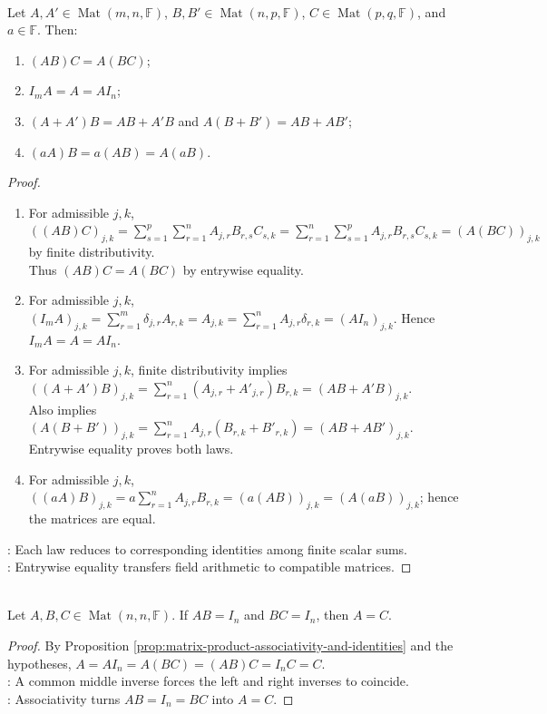 \begin{proposition} \label{prop:matrix-product-associativity-and-identities} \\
Let $A,A'\in\operatorname{Mat}(m,n,\mathbb{F})$, $B,B'\in\operatorname{Mat}(n,p,\mathbb{F})$, $C\in\operatorname{Mat}(p,q,\mathbb{F})$, and $a\in\mathbb{F}$. Then:
\begin{enumerate}[label=(\roman*)]
\setlength{\itemsep}{0pt}
\item $(AB)C=A(BC)$;
\item $I_mA=A=AI_n$;
\item $(A+A')B=AB+A'B$ and $A(B+B')=AB+AB'$;
\item $(aA)B=a(AB)=A(aB)$.
\end{enumerate}
\begin{proof}
\begin{enumerate}[label=(\roman*)]
\setlength{\itemsep}{0pt}
\item For admissible $j,k$, $((AB)C)_{j,k}=\sum\limits_{s=1}^{p}\sum\limits_{r=1}^{n}A_{j,r}B_{r,s}C_{s,k}=\sum\limits_{r=1}^{n}\sum\limits_{s=1}^{p}A_{j,r}B_{r,s}C_{s,k}=(A(BC))_{j,k}$ by finite distributivity.\\
Thus $(AB)C=A(BC)$ by entrywise equality.
\item For admissible $j,k$, $(I_mA)_{j,k}=\sum\limits_{r=1}^{m}\delta_{j,r}A_{r,k}=A_{j,k}=\sum\limits_{r=1}^{n}A_{j,r}\delta_{r,k}=(AI_n)_{j,k}$. Hence $I_mA=A=AI_n$.
\item For admissible $j,k$, finite distributivity implies $((A+A')B)_{j,k}=\sum\limits_{r=1}^{n}(A_{j,r}+A'_{j,r})B_{r,k}=(AB+A'B)_{j,k}$.\\
Also implies $(A(B+B'))_{j,k}=\sum\limits_{r=1}^{n}A_{j,r}(B_{r,k}+B'_{r,k})=(AB+AB')_{j,k}$. Entrywise equality proves both laws.
\item For admissible $j,k$, $((aA)B)_{j,k}=a\sum\limits_{r=1}^{n}A_{j,r}B_{r,k}=(a(AB))_{j,k}=(A(aB))_{j,k}$; hence the matrices are equal.
\end{enumerate}
: Each law reduces to corresponding identities among finite scalar sums.\\
: Entrywise equality transfers field arithmetic to compatible matrices.
\end{proof}
\end{proposition}

\begin{lemma} \label{lem:two-sided-inverse-uniqueness} \\
Let $A,B,C\in\operatorname{Mat}(n,n,\mathbb{F})$. If $AB=I_n$ and $BC=I_n$, then $A=C$.
\begin{proof}
By Proposition \ref{prop:matrix-product-associativity-and-identities} and the hypotheses, $A=AI_n=A(BC)=(AB)C=I_nC=C$.\\
: A common middle inverse forces the left and right inverses to coincide.\\
: Associativity turns $AB=I_n=BC$ into $A=C$.
\end{proof}
\end{lemma}

